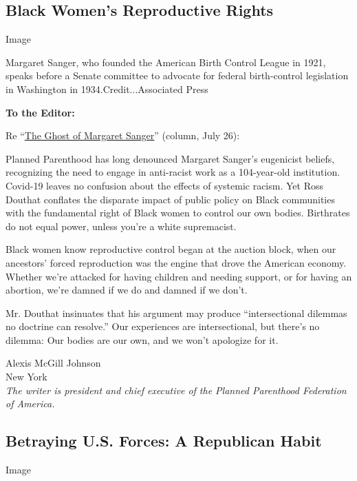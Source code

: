 \hypertarget{black-womens-reproductive-rights}{%
\subsection{Black Women's Reproductive
Rights}\label{black-womens-reproductive-rights}}

Image

Margaret Sanger, who founded the American Birth Control League in 1921,
speaks before a Senate committee to advocate for federal birth-control
legislation in Washington in 1934.Credit...Associated Press

\textbf{To the Editor:}

Re
``\href{https://www.nytimes.com/2020/07/25/opinion/sunday/abortion-racism-margaret-sanger.html}{The
Ghost of Margaret Sanger}'' (column, July 26):

Planned Parenthood has long denounced Margaret Sanger's eugenicist
beliefs, recognizing the need to engage in anti-racist work as a
104-year-old institution. Covid-19 leaves no confusion about the effects
of systemic racism. Yet Ross Douthat conflates the disparate impact of
public policy on Black communities with the fundamental right of Black
women to control our own bodies. Birthrates do not equal power, unless
you're a white supremacist.

Black women know reproductive control began at the auction block, when
our ancestors' forced reproduction was the engine that drove the
American economy. Whether we're attacked for having children and needing
support, or for having an abortion, we're damned if we do and damned if
we don't.

Mr. Douthat insinuates that his argument may produce ``intersectional
dilemmas no doctrine can resolve.'' Our experiences are intersectional,
but there's no dilemma: Our bodies are our own, and we won't apologize
for it.

Alexis McGill Johnson\\
New York\\
\emph{The writer is president and chief executive of the Planned
Parenthood Federation of America.}

\hypertarget{betraying-us-forces-a-republican-habit}{%
\subsection{Betraying U.S. Forces: A Republican
Habit}\label{betraying-us-forces-a-republican-habit}}

Image

